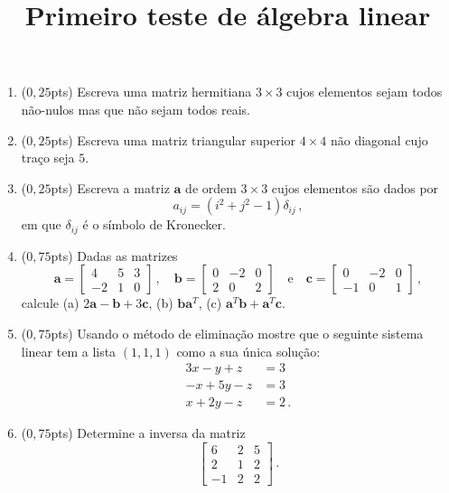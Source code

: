 \documentclass[12pt,a4paper]{article}
\title{Primeiro teste de álgebra linear}
\date{}
\newcommand{\mb}{\mathbf}
\begin{document}
\maketitle
\begin{enumerate}
  \item ($0{,}25$pts) Escreva uma matriz hermitiana $3\times 3$ cujos elementos sejam todos não-nulos mas que não sejam todos reais.
  \item ($0{,}25$pts) Escreva uma matriz triangular superior $4\times 4$ não diagonal cujo traço seja $5$.
  \item ($0,25$pts) Escreva a matriz $\mb a$ de ordem $3\times 3$ cujos elementos são dados por
  $$a_{ij}=(i^2+j^2-1)\delta_{ij}\,,$$
  em que $\delta_{ij}$ é o símbolo de Kronecker.
  \item ($0{,}75$pts) Dadas as matrizes
  $$\mb a=\begin{bmatrix}
    4&5&3\\
    -2&1&0
  \end{bmatrix}\,,\quad \mb b=\begin{bmatrix}
    0&-2&0\\
    2&0&2
  \end{bmatrix}\quad\text{e}\quad \mb c=\begin{bmatrix}
      0&-2&0\\
      -1&0&1
  \end{bmatrix}\,,$$
  calcule (a) $2\mb a-\mb b+3\mb c$, (b) $\mb b\mb a^T$, (c) $\mb a^T\mb b+\mb a^T\mb c$.%
  \item ($0{,}75$pts) Usando o método de eliminação mostre que o seguinte sistema linear tem a lista $(1,1,1)$ como a sua única solução:
  \begin{equation*}
    \begin{split}
      3x-y+z&=3\\
      -x+5y-z&=3\\
      x+2y-z&=2\,.
    \end{split}
  \end{equation*}
  \item ($0{,}75$pts) Determine a inversa da matriz
  $$\begin{bmatrix}
      6&2&5\\
      2&1&2\\
      -1&2&2
  \end{bmatrix}\,.$$
\end{enumerate}
\end{document}
